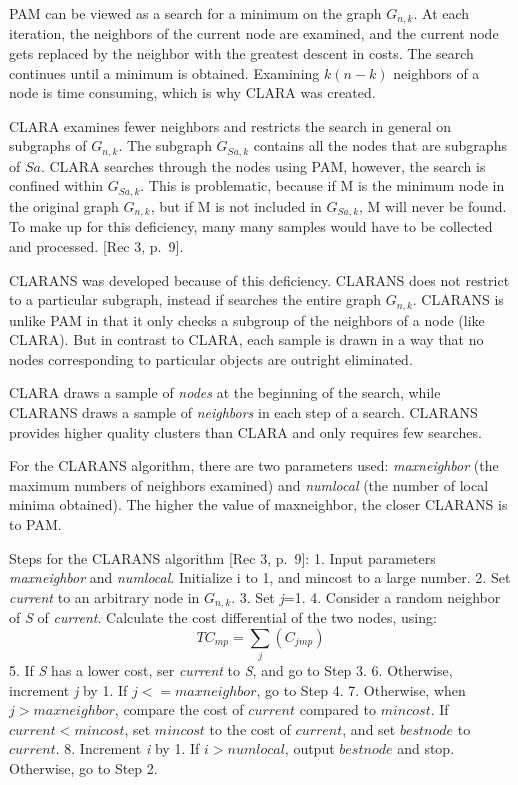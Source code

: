\documentclass[12pt,twoside]{amherstthesis}
\begin{document}
  PAM can be viewed as a search for a minimum on the graph \(G_{n,k}\). At
  each iteration, the neighbors of the current node are examined, and the
  current node gets replaced by the neighbor with the greatest descent in
  costs. The search continues until a minimum is obtained. Examining
  \(k(n-k)\) neighbors of a node is time consuming, which is why CLARA was
  created.
  
  CLARA examines fewer neighbors and restricts the search in general on
  subgraphs of \(G_{n,k}\). The subgraph \(G_{Sa,k}\) contains all the
  nodes that are subgraphs of \(Sa\). CLARA searches through the nodes
  using PAM, however, the search is confined within \(G_{Sa,k}\). This is
  problematic, because if M is the minimum node in the original graph
  \(G_{n,k}\), but if M is not included in \(G_{Sa,k}\), M will never be
  found. To make up for this deficiency, many many samples would have to
  be collected and processed. {[}Rec 3, p.~9{]}.
  
  CLARANS was developed because of this deficiency. CLARANS does not
  restrict to a particular subgraph, instead if searches the entire graph
  \(G_{n,k}\). CLARANS is unlike PAM in that it only checks a subgroup of
  the neighbors of a node (like CLARA). But in contrast to CLARA, each
  sample is drawn in a way that no nodes corresponding to particular
  objects are outright eliminated.
  
  CLARA draws a sample of \emph{nodes} at the beginning of the search,
  while CLARANS draws a sample of \emph{neighbors} in each step of a
  search. CLARANS provides higher quality clusters than CLARA and only
  requires few searches.
  
  For the CLARANS algorithm, there are two parameters used:
  \emph{maxneighbor} (the maximum numbers of neighbors examined) and
  \emph{numlocal} (the number of local minima obtained). The higher the
  value of maxneighbor, the closer CLARANS is to PAM.
  
  Steps for the CLARANS algorithm {[}Rec 3, p.~9{]}: 1. Input parameters
  \emph{maxneighbor} and \emph{numlocal}. Initialize i to 1, and mincost
  to a large number. 2. Set \emph{current} to an arbitrary node in
  \(G_{n,k}\). 3. Set \emph{j}=1. 4. Consider a random neighbor of
  \emph{S} of \emph{current}. Calculate the cost differential of the two
  nodes, using: \[ TC_{mp} = \sum_j(C_{jmp}) \] 5. If \emph{S} has a lower
  cost, ser \emph{current} to \emph{S}, and go to Step 3. 6. Otherwise,
  increment \emph{j} by 1. If \(j <= maxneighbor\), go to Step 4. 7.
  Otherwise, when \(j > maxneighbor\), compare the cost of \(current\)
  compared to \(mincost\). If \(current < mincost\), set \(mincost\) to
  the cost of \(current\), and set \(bestnode\) to \(current\). 8.
  Increment \emph{i} by 1. If \(i> numlocal\), output \(bestnode\) and
  stop. Otherwise, go to Step 2.
  
\end{document}
